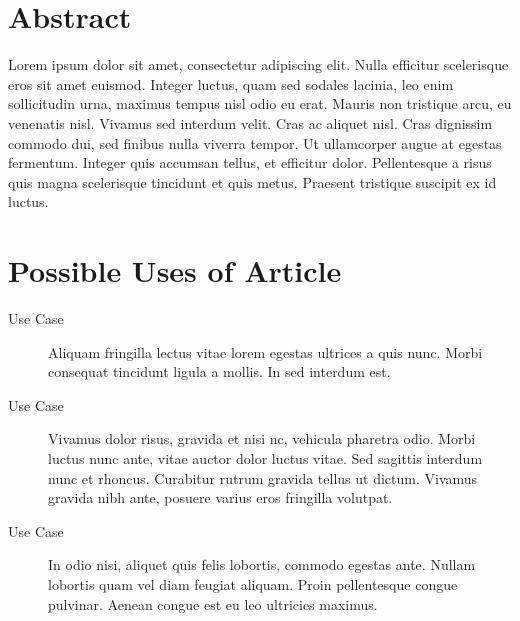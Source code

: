 \documentclass[10pt,letterpaper,twocolumn,landscape]{article}
\author{K. M. Short} %
\begin{document}

\thispagestyle{fancy} %



\section*{Abstract} %

Lorem ipsum dolor sit amet, consectetur adipiscing elit. Nulla efficitur scelerisque eros sit amet euismod. Integer luctus, quam sed sodales lacinia, leo enim sollicitudin urna, maximus tempus nisl odio eu erat. Mauris non tristique arcu, eu venenatis nisl. Vivamus sed interdum velit. Cras ac aliquet nisl. Cras dignissim commodo dui, sed finibus nulla viverra tempor. Ut ullamcorper augue at egestas fermentum. Integer quis accumsan tellus, et efficitur dolor. Pellentesque a risus quis magna scelerisque tincidunt et quis metus. Praesent tristique suscipit ex id luctus.


\section{Possible Uses of Article} %

\begin{description}
	\item [Use Case]  Aliquam fringilla lectus vitae lorem egestas ultrices a quis nunc. Morbi consequat tincidunt ligula a mollis. In sed interdum est.
    \item [Use Case] Vivamus dolor risus, gravida et nisi nc, vehicula pharetra odio. Morbi luctus nunc ante, vitae auctor dolor luctus vitae. Sed sagittis interdum nunc et rhoncus. Curabitur rutrum gravida tellus ut dictum. Vivamus gravida nibh ante, posuere varius eros fringilla volutpat.
    \item [Use Case] In odio nisi, aliquet quis felis lobortis, commodo egestas ante. Nullam lobortis quam vel diam feugiat aliquam. Proin pellentesque congue pulvinar. Aenean congue est eu leo ultricies maximus.
\end{description}
\end{document}
